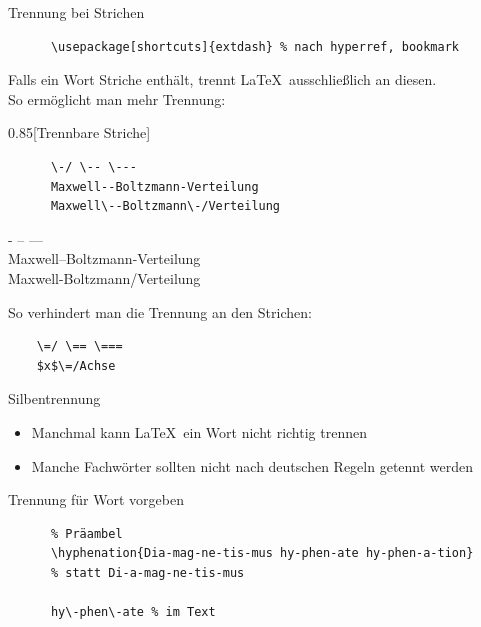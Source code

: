 \begin{frame}[fragile]{
  Trennung bei Strichen \hfill
}
  \vspace*{-2em}
  \begin{Packages}
    \begin{lstlisting}
      \usepackage[shortcuts]{extdash} % nach hyperref, bookmark
    \end{lstlisting}
  \end{Packages}

  Falls ein Wort Striche enthält, trennt \LaTeX\ ausschließlich an diesen.\\
  So ermöglicht man mehr Trennung:
  \vspace{-0.5em}
  \begin{CodeExample}{0.85}[Trennbare Striche]
    \begin{lstlisting}
      \-/ \-- \---
      Maxwell--Boltzmann-Verteilung
      Maxwell\--Boltzmann\-/Verteilung
    \end{lstlisting}
  \CodeResult
    - -- --- \\
    Maxwell--Boltzmann-Verteilung \\
    Maxwell\--Boltzmann\-/Verteilung
  \end{CodeExample}

  \vspace{-7em}
  So verhindert man die Trennung an den Strichen:
  \begin{lstlisting}
    \=/ \== \===
    $x$\=/Achse
  \end{lstlisting}
\end{frame}

\begin{frame}[fragile]{Silbentrennung}
  \begin{itemize}
    \item Manchmal kann \LaTeX\ ein Wort nicht richtig trennen
    \item Manche Fachwörter sollten nicht nach deutschen Regeln getennt werden
  \end{itemize}
  \begin{block}{Trennung für Wort vorgeben}
    \begin{lstlisting}
      % Präambel
      \hyphenation{Dia-mag-ne-tis-mus hy-phen-ate hy-phen-a-tion}
      % statt Di-a-mag-ne-tis-mus

      hy\-phen\-ate % im Text
    \end{lstlisting}
  \end{block}
\end{frame}
